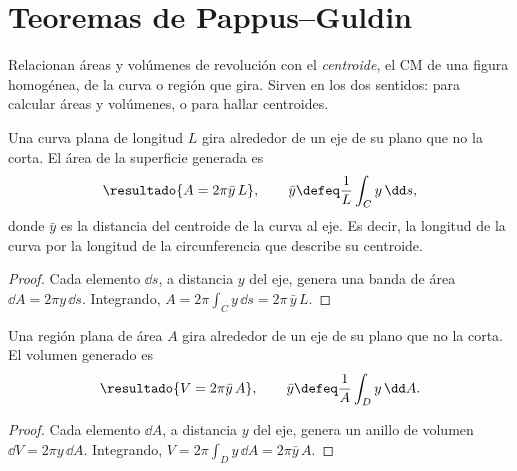 \section{Teoremas de Pappus--Guldin}
\label{sec:pappus}

Relacionan áreas y volúmenes de revolución con el \emph{centroide}, el CM
de una figura homogénea, de la curva o región que gira. Sirven en los dos
sentidos: para calcular áreas y volúmenes, o para hallar centroides.

\begin{teorema}
\label{teo:pappus1}
Una curva plana de longitud $L$ gira alrededor de un eje de su plano que no
la corta. El área de la superficie generada es
\begin{equation}
  \resultado{A=2\pi\bar y\,L},\qquad \bar y\defeq\frac1L\int_{C}y\,\dd s ,
\end{equation}
donde $\bar y$ es la distancia del centroide de la curva al eje. Es decir, la
longitud de la curva por la longitud de la circunferencia que describe su centroide.
\end{teorema}

\begin{proof}
Cada elemento $\dd s$, a distancia $y$ del eje, genera una banda de área
$\dd A=2\pi y\,\dd s$. Integrando, $A=2\pi\int_{C}y\,\dd s=2\pi\,\bar y\,L$.
\end{proof}

\begin{teorema}
\label{teo:pappus2}
Una región plana de área $A$ gira alrededor de un eje de su plano que no la
corta. El volumen generado es
\begin{equation}
  \resultado{V=2\pi\bar y\,A},\qquad \bar y\defeq\frac1A\int_{D}y\,\dd A .
\end{equation}
\end{teorema}

\begin{proof}
Cada elemento $\dd A$, a distancia $y$ del eje, genera un anillo de volumen
$\dd V=2\pi y\,\dd A$. Integrando, $V=2\pi\int_{D}y\,\dd A=2\pi\bar y\,A$.
\end{proof}

